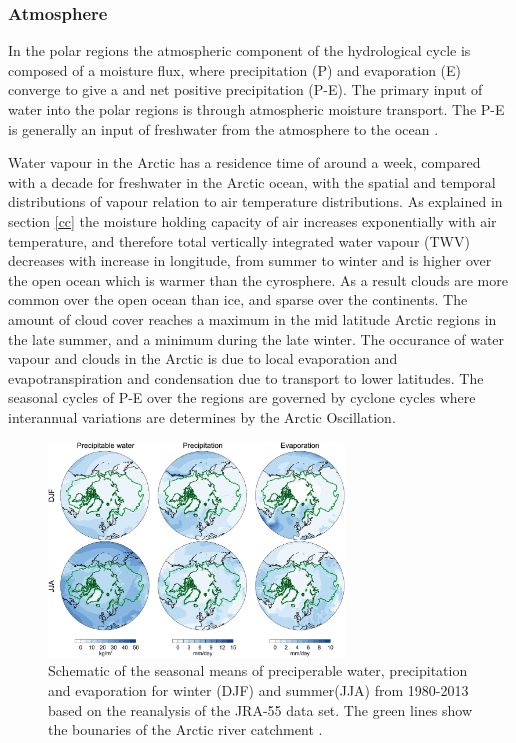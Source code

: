 \documentclass[12pt, oneside]{article}
\begin{document}
\newpage

\subsubsection{Atmosphere}

In the polar regions the atmospheric component of the hydrological cycle is composed of a moisture flux, where precipitation (P) and evaporation (E) converge to give a and net positive precipitation (P-E). The primary input of water into the polar regions is through atmospheric moisture transport. The P-E is generally an input of freshwater from the atmosphere to the ocean \cite{oshima2017atmospheric}. 

Water vapour in the Arctic has a residence time of around a week, compared with a decade for freshwater in the Arctic ocean, with the spatial and temporal distributions of vapour relation to air temperature distributions. As explained in section \ref{cc} the moisture holding capacity of air increases exponentially with air temperature, and therefore total vertically integrated water vapour (TWV) decreases with increase in longitude, from summer to winter and is higher over the open ocean which is warmer than the cyrosphere. As a result clouds are more common over the open ocean than ice, and sparse over the continents. The amount of cloud cover reaches a maximum in the mid latitude Arctic regions in the late summer, and a minimum during the late winter. The occurance of water vapour and clouds in the Arctic is due to local evaporation and evapotranspiration and condensation due to transport to lower latitudes. The seasonal cycles of P-E over the regions are governed by cyclone cycles where interannual variations are determines by the Arctic Oscillation. 

\begin{figure}[h!]
\centering
\includegraphics[width=0.7\textwidth]{figures/arctic_water_distributions.png}
\caption{Schematic of the seasonal means of preciperable water, precipitation and evaporation for winter (DJF) and summer(JJA) from 1980-2013 based on the reanalysis of the JRA-55 data set. The green lines show the bounaries of the Arctic river catchment \cite{vihma2016atmospheric}. }\label{fig:arctic_moisture}
\end{figure}
\end{document}
